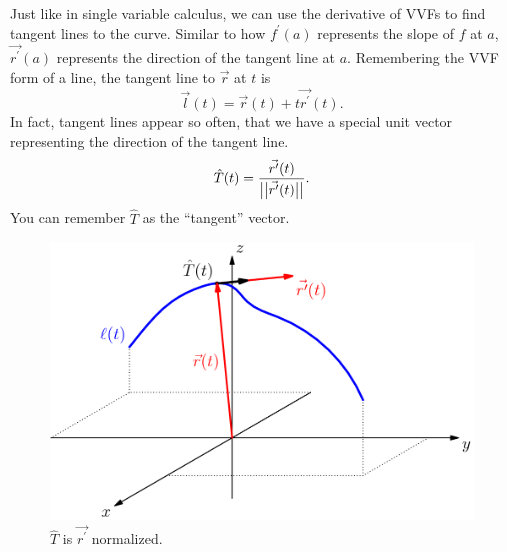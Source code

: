 \noindent
Just like in single variable calculus, we can use the derivative of VVFs to find tangent lines to the curve.
Similar to how $f^{\prime}(a)$ represents the slope of $f$ at $a$, $\vec{r^\prime}(a)$ represents the direction of the tangent line at $a$.
Remembering the VVF form of a line, the tangent line to $\vec{r}$ at $t$ is 
\begin{equation*}
	\vec{l}(t)=\vec{r}(t)+t\vec{r^\prime}(t).
\end{equation*}
In fact, tangent lines appear so often, that we have a special unit vector representing the direction of the tangent line.
\begin{equation*}
	\hat{T}(t) = \frac{\vec{r^\prime}(t)}{\big\lvert \big\lvert \vec{r^\prime}(t) \big\rvert \big\rvert}.
\end{equation*}
You can remember $\hat{T}$ as the ``tangent'' vector.

\begin{figure}[H]
	\centering
	\includegraphics[scale=0.33]{Images/vectorValuedFunctions/TangentVector}
	\caption{$\hat{T}$ is $\vec{r^\prime}$ normalized.}
\end{figure}